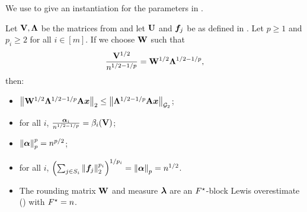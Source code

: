 \documentclass[11pt]{article}
\numberwithin{equation}{section}
\begin{document}
We use  to give an instantiation for the parameters in .

\begin{lemma}
\label{lemma:block_instantiation_small}
Let \(\mathbf{V}, \mathbf{\Lambda}\) be the matrices from  and let $\mathbf{U}$ and $\bm{f}_j$ be as defined in . Let $p \ge 1$ and $p_i \ge 2$ for all $i \in [m]$. If we choose \(\mathbf{W}\) such that
\begin{align*}
    \frac{\mathbf{V}^{1/2}}{n^{1/2-1/p}} = \mathbf{W}^{1/2}\mathbf{\Lambda}^{1/2-1/p},
\end{align*}
then:
\begin{itemize}
    \item $\left\lVert \mathbf{W}^{1/2}\mathbf{\Lambda}^{1/2-1/p}\mathbf{A}\bm{x} \right\rVert_2 \le \left\lVert \mathbf{\Lambda}^{1/2-1/p}\mathbf{A}\bm{x} \right\rVert_{\mathcal{G}_{2}}$;
    \item for all $i$, $\frac{\bm{\alpha}_i}{n^{1/2-1/p}} = \beta_i(\mathbf{V})$;
    \item $\left\lVert \bm{\alpha} \right\rVert_p^p = n^{p/2}$;
    \item for all $i$, $\left(\sum_{j \in S_i} \left\lVert \bm{f}_j \right\rVert_2^{p_i}\right)^{1/p_i} = \left\lVert \bm{\alpha} \right\rVert_p = n^{1/2}$.
    \item The rounding matrix $\mathbf{W}$ and measure $\bm{\lambda}$ are an $F^{\star}$-block Lewis overestimate () with $F^{\star} = n$.
\end{itemize}
\end{lemma}
\end{document}
